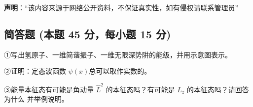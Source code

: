 
\textbf{声明}：“该内容来源于网络公开资料，不保证真实性，如有侵权请联系管理员”

\subsection{简答题 (本题 45 分，每小题 15 分)}

①写出氢原子、一维简谐振子、一维无限深势阱的能级，并用示意图表示。

②证明：定态波函数 $\psi(x)$总可以取作实数的。

③能量本征态有可能是角动量 $\hat{L}^2$ 的本征态吗？有可能是 $\hat{L}_z$ 的本征态吗？请回答为什么
并举例说明。